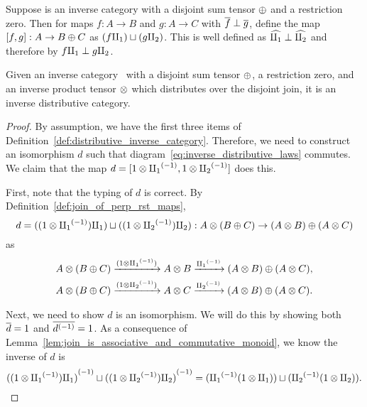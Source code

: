\begin{definition}\label{def:join_of_perp_rst_maps}
  Suppose \X is an inverse category with a disjoint sum tensor $\oplus$ and a restriction zero. Then
  for maps $f:A \to B$ and $g:A \to C$ with $\overline{f} \perp \overline{g}$, define the map $[f,g]:A \to
  B\oplus C$ as $(f \amalg_{1}) \sqcup (g \amalg_{2})$. This is well defined as $\widehat{\amalg_{1}} \perp \widehat{\amalg_{2}}$ and
  therefore by $f\amalg_{1} \perp g\amalg_{2}$.
\end{definition}

\begin{lemma}
  Given an inverse category \X\ with a disjoint sum tensor $\oplus$, a restriction zero, and an inverse
  product tensor $\otimes$ which distributes over the disjoint join, it is an inverse distributive
  category.
\end{lemma}
\begin{proof}
  By assumption, we have the first three items of Definition~\ref{def:distributive_inverse_category}.
  Therefore, we need to construct an isomorphism $d$ such that diagram~\ref{eq:inverse_distributive_laws}
  commutes.
  We claim that the map $d = [1\otimes {\amalg_{1}}^{(-1)}, 1\otimes {\amalg_{2}}^{(-1)}]$ does this.

  First, note that the typing of $d$ is correct. By Definition~\ref{def:join_of_perp_rst_maps},
  \[
    d = ((1 \otimes {\amalg_{1}}^{(-1)}) \amalg_{1} )\sqcup ((1\otimes{\amalg_{2}}^{(-1)}) \amalg_{2}) : A \otimes (B \oplus C) \to (A\otimes B)\oplus(A\otimes C)
  \]
  as
  \begin{align*}
      A \otimes (B \oplus C) & \xrightarrow{(1\otimes{\amalg_{1}}^{(-1)})} A\otimes B \xrightarrow{{\amalg_{1}}^{(-1)}} (A\otimes B)\oplus(A\otimes C),\\
      A \otimes (B \oplus C) & \xrightarrow{(1\otimes{\amalg_{2}}^{(-1)})} A\otimes C \xrightarrow{{\amalg_{2}}^{(-1)}} (A\otimes B)\oplus(A\otimes C).
  \end{align*}

  Next, we need to show $d$ is an isomorphism. We will do this by showing both $\overline{d} = 1$ and
  $\overline{{d}^{(-1)}} = 1$.
  As a consequence of Lemma~\ref{lem:join_is_associative_and_commutative_monoid}, we know
  the inverse of $d$ is
  \[
    {((1 \otimes {\amalg_{1}}^{(-1)}) \amalg_{1} )}^{(-1)}\sqcup {((1\otimes\ensuremath{{\amalg_{2}}^{(-1)}}) \amalg_{2})}^{(-1)} =
      ( {\amalg_{1}}^{(-1)}(1 \otimes \amalg_{1}) ) \sqcup ( {\amalg_{2}}^{(-1)}(1\otimes\amalg_{2})).
  \]


\end{proof}

